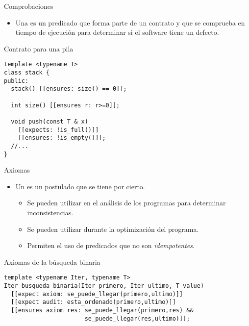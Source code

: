 \begin{frame}[t,fragile]{Comprobaciones}
\begin{itemize}
  \item Una  es un predicado que forma parte
        de un contrato y que se comprueba en tiempo de ejecución
        para determinar si el software tiene un defecto.
\end{itemize}
\begin{block}{Contrato para una pila}
\begin{lstlisting}
template <typename T>
class stack {
public:
  stack() [[ensures: size() == 0]];

  int size() [[ensures r: r>=0]];

  void push(const T & x)
    [[expects: !is_full()]]
    [[ensures: !is_empty()]];
  //...
}
\end{lstlisting}
\end{block}
\end{frame}

\begin{frame}[t,fragile]{Axiomas}
\begin{itemize}
  \item Un  es un postulado que se tiene por cierto.
    \begin{itemize}
      \item Se pueden utilizar en el análisis de los programas para
            determinar inconsistencias.
      \item Se pueden utilizar durante la optimización del programa.
      \item Permiten el uso de predicados que no son \emph{idempotentes}.
    \end{itemize}
\end{itemize}
\begin{block}{Axiomas de la búsqueda binaria}
\begin{lstlisting}
template <typename Iter, typename T>
Iter busqueda_binaria(Iter primero, Iter ultimo, T value)
  [[expect axiom: se_puede_llegar(primero,ultimo)]]
  [[expect audit: esta_ordenado(primero,ultimo)]]
  [[ensures axiom res: se_puede_llegar(primero,res) &&
                       se_puede_llegar(res,ultimo)]];
\end{lstlisting}
\end{block}
\end{frame}

